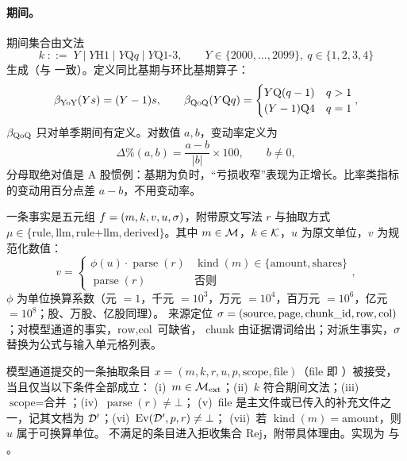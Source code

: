 \paragraph{期间。}
期间集合由文法
\[
k \;::=\; Y \mid Y\text{H1} \mid Y\text{Q}q \mid Y\text{Q1-3},\qquad Y\in\{2000,\dots,2099\},\ q\in\{1,2,3,4\}
\]
生成（与  一致）。定义同比基期与环比基期算子：
\[
\beta_{\operatorname{YoY}}(Y s) = (Y-1)s,\qquad
\beta_{\operatorname{QoQ}}(Y\text{Q}q) = \begin{cases} Y\text{Q}(q-1) & q>1\\ (Y-1)\text{Q4} & q=1\end{cases},
\]
$\beta_{\operatorname{QoQ}}$ 只对单季期间有定义。对数值 $a,b$，变动率定义为
\begin{equation}
\Delta\%(a,b)=\frac{a-b}{|b|}\times 100,\qquad b\neq 0,
\label{eq:prob-pct}
\end{equation}
分母取绝对值是 A 股惯例：基期为负时，“亏损收窄”表现为正增长。比率类指标的变动用百分点差 $a-b$，不用变动率。

\begin{definition}[事实]
\label{def:prob-fact}
一条事实是五元组 $f=(m,k,v,u,\sigma)$，附带原文写法 $r$ 与抽取方式 $\mu\in\{\text{rule},\text{llm},\text{rule+llm},\text{derived}\}$。其中
$m\in\mathcal{M}$，$k\in\mathcal{K}$，$u$ 为原文单位，$v$ 为规范化数值：
\[
v = \begin{cases} \phi(u)\cdot\operatorname{parse}(r) & \operatorname{kind}(m)\in\{\text{amount},\text{shares}\}\\
\operatorname{parse}(r) & \text{否则}\end{cases},
\]
$\phi$ 为单位换算系数（元 $=1$，千元 $=10^3$，万元 $=10^4$，百万元 $=10^6$，亿元 $=10^8$；股、万股、亿股同理）。
来源定位 $\sigma=(\text{source},\text{page},\text{chunk\_id},\text{row},\text{col})$；对模型通道的事实，$\text{row},\text{col}$ 可缺省，
chunk 由证据谓词给出；对派生事实，$\sigma$ 替换为公式与输入单元格列表。
\end{definition}

\begin{definition}[可接受的模型抽取条目]
\label{def:prob-accept}
模型通道提交的一条抽取条目 $x=(m,k,r,u,p,\text{scope},\text{file})$（file 即 ）被接受，当且仅当以下条件全部成立：
(i)~$m\in\mathcal{M}_{\text{ext}}$；(ii)~$k$ 符合期间文法；(iii)~$\text{scope}=\text{合并}$；(iv)~$\operatorname{parse}(r)\neq\bot$；
(v)~file 是主文件或已传入的补充文件之一，记其文档为 $\mathcal{D}'$；(vi)~$\operatorname{Ev}(\mathcal{D}',p,r)\neq\bot$；
(vii)~若 $\operatorname{kind}(m)=\text{amount}$，则 $u$ 属于可换算单位。
不满足的条目进入拒收集合 $\mathrm{Rej}$，附带具体理由。实现为  与 。
\end{definition}

